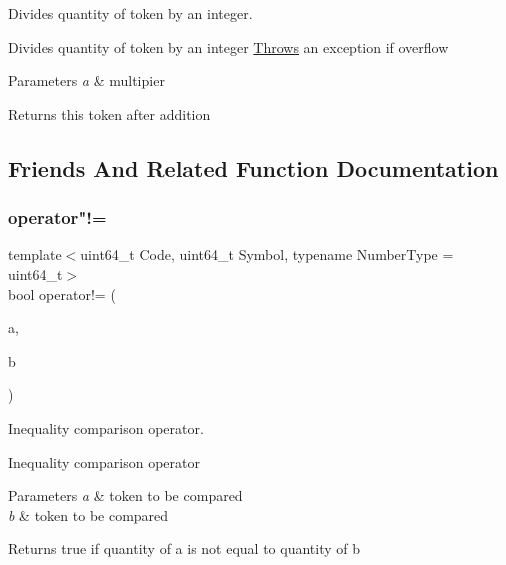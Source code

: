 Divides quantity of token by an integer. 

Divides quantity of token by an integer \mbox{\hyperlink{struct_throws}{Throws}} an exception if overflow 
\begin{DoxyParams}{Parameters}
{\em a} & multipier \\
\hline
\end{DoxyParams}
\begin{DoxyReturn}{Returns}
this token after addition 
\end{DoxyReturn}


\subsection{Friends And Related Function Documentation}
\mbox{\label{classaacio_1_1token_a688813be9dc1e8f175d19ef1ffca4f6e}} 
\subsubsection{\texorpdfstring{operator"!=}{operator!=}}
{\footnotesize\ttfamily template$<$uint64\+\_\+t Code, uint64\+\_\+t Symbol, typename Number\+Type  = uint64\+\_\+t$>$ \\
bool operator!= (\begin{DoxyParamCaption}\item[{const \mbox{\hyperlink{classaacio_1_1token}{token}}$<$ Code, Symbol, Number\+Type $>$ \&}]{a,  }\item[{const \mbox{\hyperlink{classaacio_1_1token}{token}}$<$ Code, Symbol, Number\+Type $>$ \&}]{b }\end{DoxyParamCaption})\hspace{0.3cm}{\ttfamily [friend]}}



Inequality comparison operator. 

Inequality comparison operator 
\begin{DoxyParams}{Parameters}
{\em a} & token to be compared \\
\hline
{\em b} & token to be compared \\
\hline
\end{DoxyParams}
\begin{DoxyReturn}{Returns}
true if quantity of a is not equal to quantity of b 
\end{DoxyReturn}
\mbox{\label{classaacio_1_1token_a0008c3c01294f2ccb1f36274929f3d54}} 

